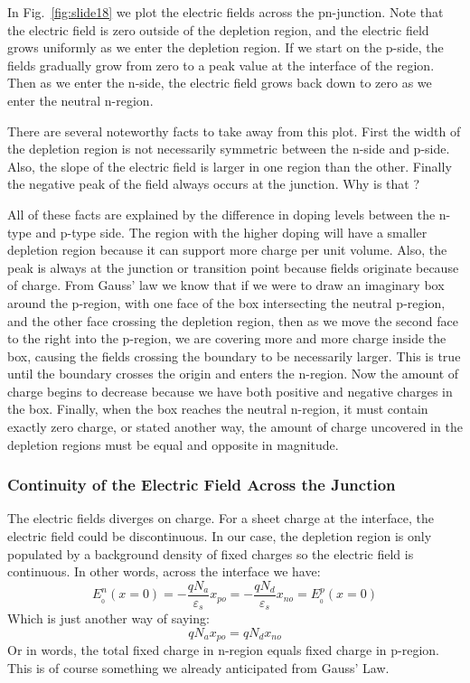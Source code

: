 In Fig.~\ref{fig:slide18} we plot the electric fields across the pn-junction.  Note that the electric field is zero outside of the depletion region, and the electric field grows uniformly as we enter the depletion region.  If we start on the p-side, the fields gradually grow from zero to a peak value at the interface of the region.  Then as we enter the n-side, the electric field grows back down to zero as we enter the neutral n-region.  

There are several noteworthy facts to take away from this plot.  First the width of the depletion region is not necessarily symmetric between the n-side and p-side.  Also, the slope of the electric field is larger in one region than the other.  Finally the negative peak of the field always occurs at the junction.  Why is that ?

All of these facts are explained by the difference in doping levels between the n-type and p-type side.  The region with the higher doping will have a smaller depletion region because it can support more charge per unit volume.  Also, the peak is always at the junction or transition point because fields originate because of charge.  From Gauss' law we know that if we were to draw an imaginary box around the p-region, with one face of the box intersecting the neutral p-region, and the other face crossing the depletion region, then as we move the second face to the right into the p-region, we are covering more and more charge inside the box, causing the fields crossing the boundary to be necessarily larger.  This is true until the boundary crosses the origin and enters the n-region.  Now the amount of charge begins to decrease because we have both positive and negative charges in the box.  Finally, when the box reaches the neutral n-region, it must contain exactly zero charge, or stated another way, the amount of charge uncovered in the depletion regions must be equal and opposite in magnitude.
\subsubsection{Continuity of the Electric Field Across the Junction}
The electric fields diverges on charge. For a sheet charge at the interface, the electric field could be discontinuous.   In our case, the depletion region is only populated by a background density of fixed charges so the electric field is continuous.  In other words, across the interface we have:
\begin{equation} 
	E_{_0}^n(x = 0) =  - \frac{{q{N_a}}}{{{\varepsilon _s}}}{x_{po}} =  - \frac{{q{N_d}}}{{{\varepsilon _s}}}{x_{no}} = E_{_0}^p(x = 0) 
\end{equation}
Which is just another way of saying:
\begin{equation} 
	q{N_a}{x_{po}} = q{N_d}{x_{no}} 
\end{equation}
Or in words, the total fixed charge in n-region equals fixed charge in p-region.  This is of course something we already anticipated from Gauss' Law.
